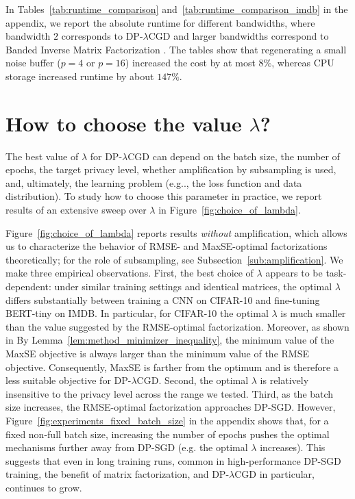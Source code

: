 \documentclass{article}
\makeatletter
\DeclareRobustCommand\onedot{\futurelet\@let@token\@onedot}
\def\@onedot{\ifx\@let@token.\else.\null\fi\xspace}
\def\eg{{e.g}\onedot} \def\Eg{{E.g}\onedot}
\theoremstyle{plain}
\theoremstyle{definition}
\theoremstyle{remark}
\newcommand{\method}{DP-$\lambda$CGD\xspace}
\makeatother
\begin{document}
In Tables~\ref{tab:runtime_comparison} and~\ref{tab:runtime_comparison_imdb} in the appendix, we report the absolute runtime for different bandwidths, where bandwidth $2$ corresponds to \method and larger bandwidths correspond to Banded Inverse Matrix Factorization \citep{kalinin2025back}. 
%
The tables show that regenerating a small noise buffer ($p=4$ or $p=16$) increased the cost by at most $8\%$, whereas CPU storage increased runtime by about $147\%$.



\section{How to choose the value $\lambda$?}
\label{sec:choice_of_lambda}

The best value of $\lambda$ for \method can depend on the batch size, the number of
epochs, the target privacy level, whether amplification by subsampling is used, and,
ultimately, the learning problem (\eg, the loss function and data distribution). 
%
To study how to choose this parameter in practice, we report results of an extensive sweep over $\lambda$ in Figure~\ref{fig:choice_of_lambda}.

Figure~\ref{fig:choice_of_lambda} reports results \emph{without} amplification, which
allows us to characterize the behavior of RMSE- and MaxSE-optimal factorizations
theoretically; for the role of subsampling, see Subsection~\ref{sub:amplification}.
We make three empirical observations. First, the best choice of $\lambda$ appears to be
task-dependent: under similar training settings and identical matrices, the optimal
$\lambda$ differs substantially between training a CNN on CIFAR-10 and fine-tuning
BERT-tiny on IMDB. In particular, for CIFAR-10 the optimal $\lambda$ is much smaller
than the value suggested by the RMSE-optimal factorization. Moreover, as shown in
By Lemma~\ref{lem:method_minimizer_inequality}, the minimum value of the MaxSE objective is always larger than the minimum value of the RMSE objective. Consequently, MaxSE is farther from the optimum and is therefore a less suitable objective for \method. Second, the
optimal $\lambda$ is relatively insensitive to the privacy level across the range we
tested. Third, as the batch size increases, the RMSE-optimal factorization approaches
DP-SGD. However, Figure~\ref{fig:experiments_fixed_batch_size} in the appendix shows that, for a fixed non-full batch size, increasing the number of epochs pushes the optimal mechanisms further away from DP-SGD (e.g. the optimal $\lambda$ increases). This suggests that even in long training runs, common in high-performance DP-SGD training, the benefit of matrix factorization, and \method in particular, continues to grow.
\end{document}
